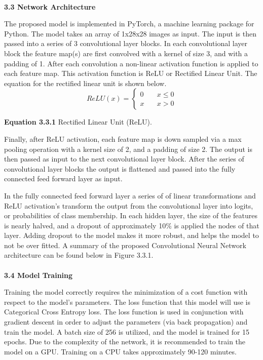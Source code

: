 \documentclass[11pt]{article}
\begin{document}
\begin{multicols}{2}
\\
\textbf{3.3 Network Architecture}
\par
The proposed model is implemented in PyTorch, a machine learning package for Python.  The model takes an array of 1x28x28 images as input.  The input is then passed into a series of 3 convolutional layer blocks.  In each convolutional layer block the feature map(s) are first convolved with a kernel of size 3, and with a padding of 1.  After each convolution a non-linear activation function is applied to each feature map.  This activation function is ReLU or Rectified Linear Unit.  The equation for the rectified linear unit is shown below.
$$
ReLU(x) = \left\{
        \begin{array}{ll}
            0 & \quad x \leq 0 \\
            x & \quad x > 0
        \end{array}
    \right.
$$
\begin{center}
\textbf{Equation 3.3.1} Rectified Linear Unit (ReLU).
\end{center}

\par
Finally, after ReLU activation, each feature map is down sampled via a max pooling operation with a kernel size of 2, and a padding of size 2.  The output is then passed as input to the next convolutional layer block.  After the series of convolutional layer blocks the output is flattened and passed into the fully connected feed forward layer as input.
\par
In the fully connected feed forward layer a series of of linear transformations and ReLU activation's transform the output from the convolutional layer into logits, or probabilities of class membership.  In each hidden layer, the size of the features is nearly halved, and a dropout of approximately 10\% is applied the nodes of that layer.  Adding dropout to the model makes it more robust, and helps the model to not be over fitted.  A summary of the proposed Convolutional Neural Network architecture can be found below in Figure 3.3.1.
\\ \\
\textbf{3.4 Model Training}
\par
Training the model correctly requires the minimization of a cost function with respect to the model's parameters.  The loss function that this model will use is Categorical Cross Entropy loss.  The loss function is used in conjunction with gradient descent in order to adjust the parameters (via back propagation) and train the model.  A batch size of 256 is utilized, and the model is trained for 15 epochs.  Due to the complexity of the network, it is recommended to train the model on a GPU.  Training on a CPU takes approximately 90-120 minutes.

\end{multicols}
\end{document}
